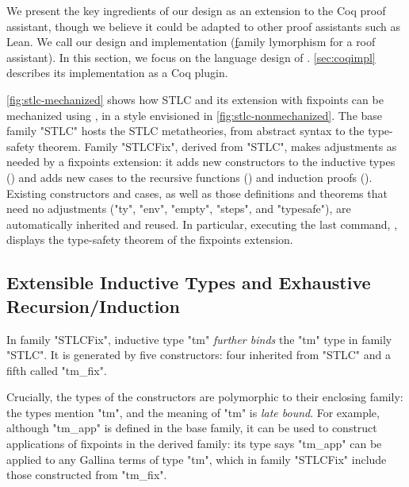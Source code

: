 We present the key ingredients of our design as an extension to the Coq
proof assistant,
though we believe it could be adapted to other proof assistants such as Lean.
We call our design and implementation \Lang (\underline{f}amily
\underline{}lymorphism for a \underline{}roof assistant).
In this section, we focus on the language design of \Lang.
\cref{sec:coqimpl} describes its implementation as a Coq plugin.



\cref{fig:stlc-mechanized} shows how STLC and its extension with
fixpoints can be mechanized using \Lang, in a style envisioned in
\cref{fig:stlc-nonmechanized}.
The base family "STLC" hosts the STLC metatheories, from abstract syntax
to the type-safety theorem.
Family "STLCFix", derived from "STLC", makes adjustments as needed by a fixpoints extension:
it adds new constructors to the inductive types () and
adds new cases to the recursive functions () and
induction proofs ().
Existing constructors and cases, as well as those definitions and
theorems that need no adjustments ("ty", "env", "empty", "steps", and
"typesafe"), are automatically inherited and reused.
In particular, executing the last command, ,
displays the type-safety theorem of the fixpoints extension.

\subsection{Extensible Inductive Types and Exhaustive Recursion/Induction}


In family "STLCFix", inductive type "tm" \emph{further binds} the "tm" type
in family "STLC". It is generated by five constructors: four inherited from
"STLC" and a fifth called "tm_fix".

Crucially, the types of the constructors are polymorphic to their enclosing family:
the types mention "tm", and the meaning of "tm" is \emph{late bound}.
For example, although "tm_app" is defined in the base family,
it can be used to construct applications of fixpoints in the derived family:
its type  says "tm_app" can be applied to any
Gallina terms of type "tm",
which in family "STLCFix" include those constructed from "tm_fix".


